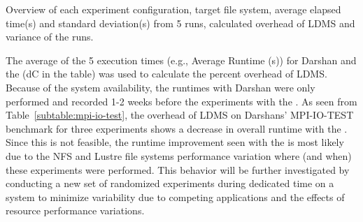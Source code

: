 \begin{table}[h]

\caption{Overview of each experiment configuration, target file system, average elapsed time(s) and standard deviation(s) from 5 runs, calculated overhead of LDMS and variance of the runs.}
\label{table:apps}
\end{table}
The average of the 5 execution times (e.g., Average Runtime (s)) for Darshan and 
the \connector{} (dC in the table) was used to calculate the percent overhead of LDMS. 
Because of the system availability, the runtimes with Darshan were only performed 
and recorded 1-2 weeks before the experiments with the \connector{}. As seen from 
Table~\ref{subtable:mpi-io-test}, the overhead of LDMS on Darshans' MPI-IO-TEST 
benchmark for three experiments shows a decrease in overall runtime with the \connector{}. 
Since this is not feasible, the runtime improvement seen with the \connector{} is most 
likely due to the NFS and Lustre file systems performance variation where (and when) 
these experiments were performed. This behavior will be further investigated by conducting
a new set of randomized experiments during dedicated time on a system to minimize variability
due to competing applications and the effects of resource performance variations.


